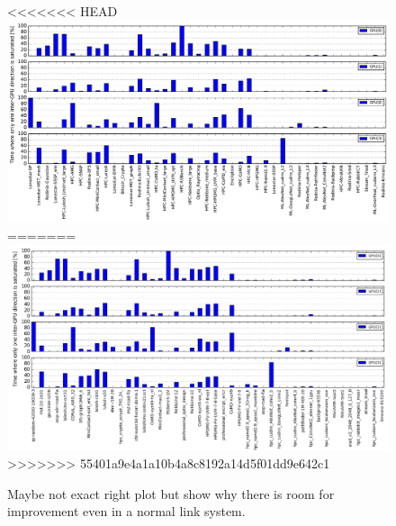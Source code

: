 \begin{figure}[tp]
    \centering
<<<<<<< HEAD
    \includegraphics[width=0.9\columnwidth]{figures/plot_nvlink_chance.pdf}
=======
    \includegraphics[width=1.0\columnwidth]{figures/link-motivation.jpg}
>>>>>>> 55401a9e4a1a10b4a8c8192a14d5f01dd9e642c1
    \caption{Maybe not exact right plot but show why there is room for 
improvement even in a normal link system.}
    \label{fig:link-motivation}
\end{figure}


